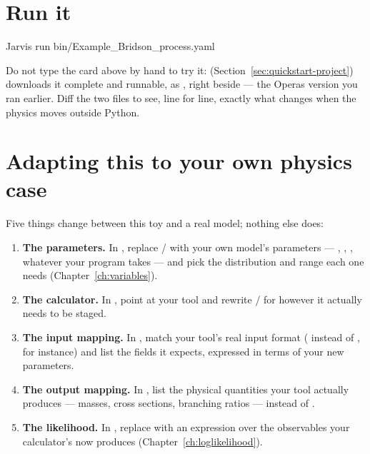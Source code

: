 \section{Run it}
\label{sec:quickstart-run2}

\begin{terminal}
\begin{jcmd}
Jarvis run bin/Example_Bridson_process.yaml
\end{jcmd}
\end{terminal}

\begin{jtip}
Do not type the card above by hand to try it: 
(Section~\ref{sec:quickstart-project}) downloads it complete and runnable, as
, right beside
 --- the Operas version you ran earlier. Diff
the two files to see, line for line, exactly what changes when the physics moves
outside Python.
\end{jtip}

\section{Adapting this to your own physics case}
\label{sec:quickstart-adapt}

Five things change between this toy and a real model; nothing else does:

\begin{enumerate}
  \item \textbf{The parameters.} In , replace /
        with your own model's parameters --- , , ,
        whatever your program takes --- and pick the distribution and range each one
        needs (Chapter~\ref{ch:variables}).
  \item \textbf{The calculator.} In , point 
        at your tool and rewrite / for
        however it actually needs to be staged.
  \item \textbf{The input mapping.} In , match your tool's real
        input format ( instead of , for instance) and
        list the fields it expects, expressed in terms of your new parameters.
  \item \textbf{The output mapping.} In , list the physical
        quantities your tool actually produces --- masses, cross sections, branching
        ratios --- instead of .
  \item \textbf{The likelihood.} In , replace
         with an expression over the observables your
        calculator's  now produces (Chapter~\ref{ch:loglikelihood}).
\end{enumerate}

